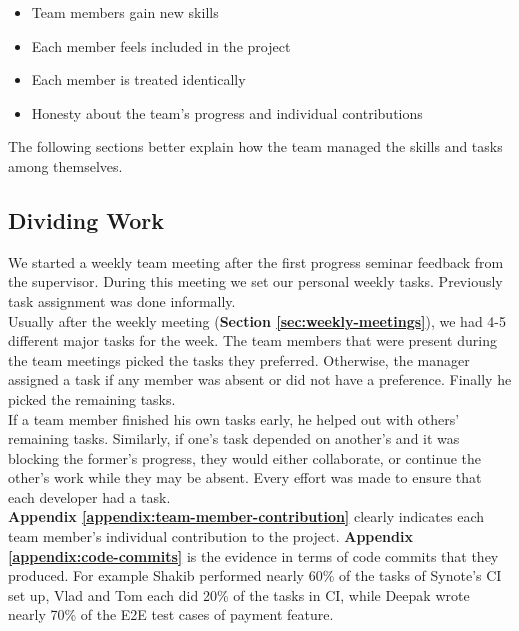 \begin{itemize}

  \item Team members gain new skills
  \item Each member feels included in the project
  \item Each member is treated identically
  \item Honesty about the team's progress and individual contributions

\end{itemize}

The following sections better explain how the team managed the skills and tasks among themselves.

\subsection{Dividing Work}
\label{subsec:dividing-work}
We started a weekly team meeting after the first progress seminar feedback from the supervisor. During this meeting we set our personal weekly tasks. Previously task assignment was done informally.\\

Usually after the weekly meeting (\textbf{Section \ref{sec:weekly-meetings}}), we had 4-5 different major tasks for the week. The team members that were present during the team meetings picked the tasks they preferred. Otherwise, the manager assigned a task if any member was absent or did not have a preference. Finally he picked the remaining tasks.\\

If a team member finished his own tasks early, he helped out with others' remaining tasks. Similarly, if one's task depended on another's and it was blocking the former's progress, they would either collaborate, or continue the other's work while they may be absent. Every effort was made to ensure that each developer had a task.\\

\textbf{Appendix \ref{appendix:team-member-contribution}} clearly indicates each team member's individual contribution to the project. \textbf{Appendix \ref{appendix:code-commits}} is the evidence in terms of code commits that they  produced. For example Shakib performed nearly 60\% of the tasks of Synote's CI set up, Vlad and Tom each did 20\% of the tasks in CI, while Deepak wrote nearly 70\% of the E2E test cases of payment feature.\\

